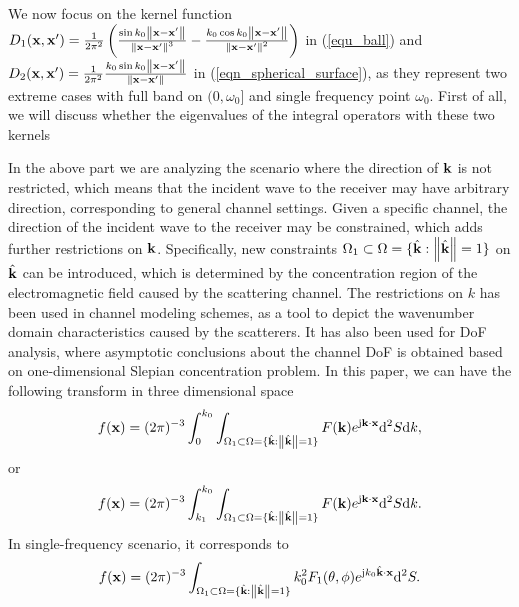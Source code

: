 \documentclass[12pt,draftclsnofoot,journal,onecolumn]{IEEEtran}
\begin{document}
{\color{red}

We now focus on the kernel function $D_1({\bf x},{\bf x}')=\frac{1}{2\pi^2} \left( \frac{\sin k_0\left\| {\bf x}-{\bf x}' \right\|}{\left\| {\bf x}-{\bf x}' \right\|^3}-\frac{k_0\cos k_0\left\| {\bf x}-{\bf x}' \right\|}{\left\| {\bf x}-{\bf x}' \right\|^2} \right)$ in (\ref{equ_ball}) and $D_2({\bf x},{\bf x}') = \frac{1}{2\pi^2} \frac{k_0\sin k_0 \left\| {\bf x}-{\bf x}' \right\|}{\left\|  {\bf x}-{\bf x}' \right\|}$ in (\ref{eqn_spherical_surface}), as they represent two extreme cases with full band on $(0,\omega_0]$ and single frequency point $\omega_0$. First of all, we will discuss whether the eigenvalues of the integral operators with these two kernels 
}
   
	In the above part we are analyzing the scenario where the direction of ${\bf k}$ is not restricted, which means that the incident wave to the receiver may have arbitrary direction, corresponding to general channel settings. Given a specific channel, the direction of the incident wave to the receiver may be constrained, which adds further restrictions on ${\bf k}$.  Specifically, new constraints ${\Omega}_1 \subset {\Omega}=\{\hat{\bf k}: \left\| \hat{\bf k} \right\|=1\}$ on $\hat{\bf k}$ can be introduced, which is determined by the concentration region of the electromagnetic field caused by the scattering channel. {\color{red} The restrictions on $k$ has been used in channel modeling schemes\cite{pizzo2022fourier}, as a tool to depict the wavenumber domain characteristics caused by the scatterers.
	It has also been used for DoF analysis\cite{poon2005degrees}, where asymptotic conclusions about the channel DoF is obtained based on one-dimensional Slepian concentration problem. } In this paper, we can have the following transform in three dimensional space
	\begin{equation}
		\begin{aligned}
			f({\bf x})=(2\pi)^{-3}\int_0^{k_0} \int_{{\Omega}_1 \subset {\Omega}=\{\hat{\bf k}: \left\| \hat{\bf k} \right\|=1\}} F({\bf k})e^{{\rm j}{\bf k}\cdot {\bf x}}{\rm d}^2S {\rm d}{k},
		\end{aligned}
		\label{eqn_wavenumber_constraint1}
	\end{equation}
	or
	\begin{equation}
		\begin{aligned}
			f({\bf x})=(2\pi)^{-3}\int_{k_1}^{k_0} \int_{{\Omega}_1 \subset {\Omega}=\{\hat{\bf k}: \left\| \hat{\bf k} \right\|=1\}} F({\bf k})e^{{\rm j}{\bf k}\cdot {\bf x}}{\rm d}^2S {\rm d}{k}.
		\end{aligned}
		\label{eqn_wavenumber_constraint2}
	\end{equation}
	In single-frequency scenario, it corresponds to
	\begin{equation}
		\begin{aligned}
			f({\bf x})=(2\pi)^{-3}\int_{{\Omega}_1 \subset {\Omega}=\{\hat{\bf k}: \left\| \hat{\bf k} \right\|=1\}}k_0^2F_1(\theta,\phi)e^{{\rm j}k_0\hat{\bf k}\cdot {\bf x}}{\rm d}^2S.
		\end{aligned}
		\label{eqn_wavenumber_constraint3}
	\end{equation}
	
\end{document}
